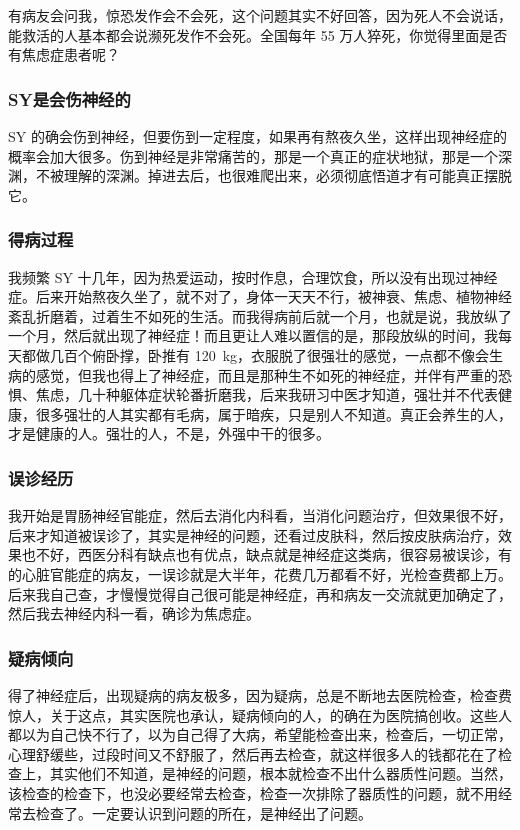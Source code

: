 \documentclass{ctexart}
\begin{document}
有病友会问我，惊恐发作会不会死，这个问题其实不好回答，因为死人不会说话，能救活的人基本都会说濒死发作不会死。全国每年 55 万人猝死，你觉得里面是否有焦虑症患者呢？

\subsubsection{SY是会伤神经的}

SY 的确会伤到神经，但要伤到一定程度，如果再有熬夜久坐，这样出现神经症的概率会加大很多。伤到神经是非常痛苦的，那是一个真正的症状地狱，那是一个深渊，不被理解的深渊。掉进去后，也很难爬出来，必须彻底悟道才有可能真正摆脱它。

\subsubsection{得病过程}

我频繁 SY 十几年，因为热爱运动，按时作息，合理饮食，所以没有出现过神经症。后来开始熬夜久坐了，就不对了，身体一天天不行，被神衰、焦虑、植物神经紊乱折磨着，过着生不如死的生活。而我得病前后就一个月，也就是说，我放纵了一个月，然后就出现了神经症！而且更让人难以置信的是，那段放纵的时间，我每天都做几百个俯卧撑，卧推有 \SI{120}{\kilo\gram}，衣服脱了很强壮的感觉，一点都不像会生病的感觉，但我也得上了神经症，而且是那种生不如死的神经症，并伴有严重的恐惧、焦虑，几十种躯体症状轮番折磨我，后来我研习中医才知道，强壮并不代表健康，很多强壮的人其实都有毛病，属于暗疾，只是别人不知道。真正会养生的人，才是健康的人。强壮的人，不是，外强中干的很多。

\subsubsection{误诊经历}

我开始是胃肠神经官能症，然后去消化内科看，当消化问题治疗，但效果很不好，后来才知道被误诊了，其实是神经的问题，还看过皮肤科，然后按皮肤病治疗，效果也不好，西医分科有缺点也有优点，缺点就是神经症这类病，很容易被误诊，有的心脏官能症的病友，一误诊就是大半年，花费几万都看不好，光检查费都上万。后来我自己查，才慢慢觉得自己很可能是神经症，再和病友一交流就更加确定了，然后我去神经内科一看，确诊为焦虑症。

\subsubsection{疑病倾向}

得了神经症后，出现疑病的病友极多，因为疑病，总是不断地去医院检查，检查费惊人，关于这点，其实医院也承认，疑病倾向的人，的确在为医院搞创收。这些人都以为自己快不行了，以为自己得了大病，希望能检查出来，检查后，一切正常，心理舒缓些，过段时间又不舒服了，然后再去检查，就这样很多人的钱都花在了检查上，其实他们不知道，是神经的问题，根本就检查不出什么器质性问题。当然，该检查的检查下，也没必要经常去检查，检查一次排除了器质性的问题，就不用经常去检查了。一定要认识到问题的所在，是神经出了问题。
\end{document}

